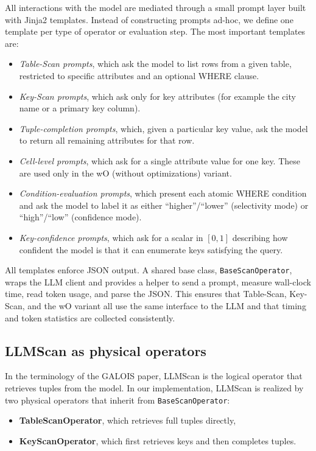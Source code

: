 \documentclass[11pt]{article}
\begin{document}
All interactions with the model are mediated through a small prompt layer built with
Jinja2 templates. Instead of constructing prompts ad-hoc, we define one template per
type of operator or evaluation step. The most important templates are:

\begin{itemize}
  \item \emph{Table-Scan prompts}, which ask the model to list rows from a given table,
    restricted to specific attributes and an optional WHERE clause.
  \item \emph{Key-Scan prompts}, which ask only for key attributes (for example the city
    name or a primary key column).
  \item \emph{Tuple-completion prompts}, which, given a particular key value, ask the
    model to return all remaining attributes for that row.
  \item \emph{Cell-level prompts}, which ask for a single attribute value for one key.
    These are used only in the wO (without optimizations) variant.
  \item \emph{Condition-evaluation prompts}, which present each atomic WHERE condition
    and ask the model to label it as either ``higher''/``lower'' (selectivity mode) or
    ``high''/``low'' (confidence mode).
  \item \emph{Key-confidence prompts}, which ask for a scalar in $[0,1]$ describing how
    confident the model is that it can enumerate keys satisfying the query.
\end{itemize}

All templates enforce JSON output. A shared base class, \texttt{BaseScanOperator},
wraps the LLM client and provides a helper to send a prompt, measure wall-clock time,
read token usage, and parse the JSON. This ensures that Table-Scan, Key-Scan, and the
wO variant all use the same interface to the LLM and that timing and token statistics
are collected consistently.

\subsection{LLMScan as physical operators}

In the terminology of the GALOIS paper, LLMScan is the logical operator that retrieves
tuples from the model. In our implementation, LLMScan is realized by two physical
operators that inherit from \texttt{BaseScanOperator}:

\begin{itemize}
  \item \textbf{TableScanOperator}, which retrieves full tuples directly,
  \item \textbf{KeyScanOperator}, which first retrieves keys and then completes tuples.
\end{itemize}
\end{document}
